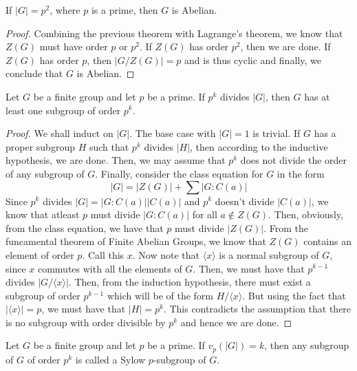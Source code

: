 \begin{corollary}
	If $|G|=p^2$, where $p$ is a prime, then $G$ is Abelian.
\end{corollary}
\begin{proof}
	Combining the previous theorem with Lagrange's theorem, we know that $Z(G)$ must have order $p$ or $p^2$. If $Z(G)$ has order $p^2$, then we are done. If $Z(G)$ has order $p$, then $|G/Z(G)|=p$ and is thus cyclic and finally, we conclude that $G$ is Abelian.
\end{proof}

\begin{theorem}
	Let $G$ be a finite group and let $p$ be a prime. If $p^k$ divides $|G|$, then $G$ has at least one subgroup of order $p^k$.
\end{theorem}
\begin{proof}
	We shall induct on $|G|$. The base case with $|G|=1$ is trivial. If $G$ has a proper subgroup $H$ such that $p^k$ divides $|H|$, then according to the inductive hypothesis, we are done. Then, we may assume that $p^k$ does not divide the order of any subgroup of $G$. Finally, consider the class equation for $G$ in the form
	\begin{equation*}
		|G| = |Z(G)| + \sum|G:C(a)|
	\end{equation*}
	Since $p^k$ divides $|G| = |G:C(a)||C(a)|$ and $p^k$ doesn't divide $|C(a)|$, we know that atleast $p$ must divide $|G:C(a)|$ for all $a\notin Z(G)$. Then, obviously, from the class equation, we have that $p$ must divide $|Z(G)|$. From the funcamental theorem of Finite Abelian Groups, we know that $Z(G)$ contains an element of order $p$. Call this $x$. Now note that $\langle x\rangle $ is a normal subgroup of $G$, since $x$ commutes with all the elements of $G$. Then, we must have that $p^{k-1}$ divides $|G/\langle x\rangle|$. Then, from the induction hypothesis, there must exist a subgroup of order $p^{k-1}$ which will be of the form $H/\langle x\rangle$. But using the fact that $|\langle x\rangle|=p$, we must have that $|H|=p^k$. This contradicts the assumption that there is no subgroup with order divisible by $p^k$ and hence we are done.
\end{proof}

\begin{definition}
	Let $G$ be a finite group and let $p$ be a prime. If $v_p(|G|)=k$, then any subgroup of $G$ of order $p^k$ is called a Sylow $p$-subgroup of $G$.
\end{definition}

